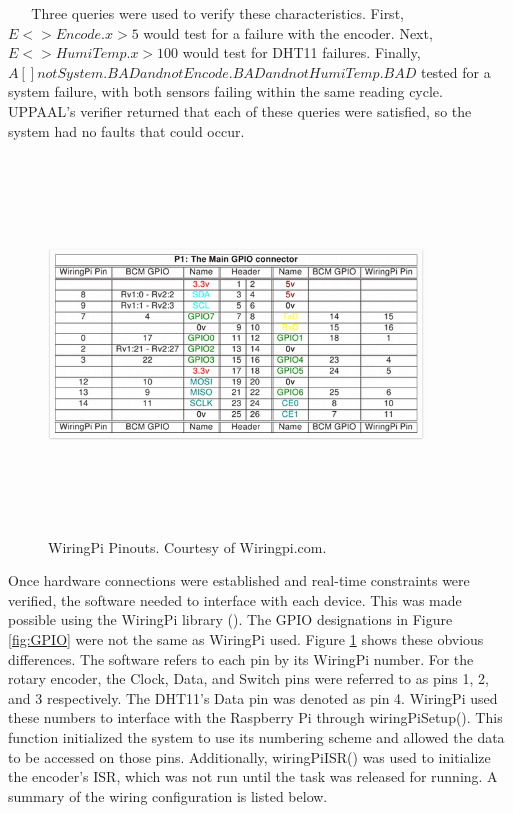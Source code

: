 \documentclass[letterpaper, 12pt]{article}
\begin{document}
~\newline
~\newline
\indent Three queries were used to verify these characteristics.  First, $E <> Encode.x > 5$ would test for a failure with the encoder.  Next, $E <> HumiTemp.x > 100$ would test for DHT11 failures.  Finally, $A[] not System.BAD and not Encode.BAD and not HumiTemp.BAD$ tested for a system failure, with both sensors failing within the same reading cycle.  UPPAAL's verifier returned that each of these queries were satisfied, so the system had no faults that could occur.

\begin{figure}[H]
	\centering
	\includegraphics[width=10cm,height=10cm,keepaspectratio]{pi_pins.png}
	\caption[Pinouts]{WiringPi Pinouts. Courtesy of Wiringpi.com.}
	\label{fig:pinouts}
\end{figure}

\indent Once hardware connections were established and real-time constraints were verified, the software needed to interface with each device.  This was made possible using the WiringPi library (\cite{gordonhenderson2018}).  The GPIO designations in Figure \ref{fig:GPIO} were not the same as WiringPi used.  Figure \ref{fig:pinouts} shows these obvious differences. The software refers to each pin by its WiringPi number.  For the rotary encoder, the Clock, Data, and Switch pins were referred to as pins 1, 2, and 3 respectively.  The DHT11's Data pin was denoted as pin 4.  WiringPi used these numbers to interface with the Raspberry Pi through wiringPiSetup().  This function initialized the system to use its numbering scheme and allowed the data to be accessed on those pins.  Additionally, wiringPiISR() was used to initialize the encoder's ISR, which was not run until the task was released for running. A summary of the wiring configuration is listed below.
\end{document}
